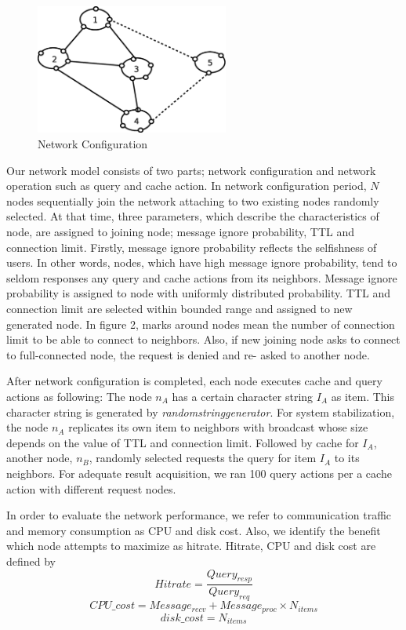 \documentclass[12pt,journal,draftcls,letterpaper,onecolumn]{IEEEtran}
\begin{document}
\begin{figure}
\centering
\includegraphics[width=2.5in]{network}
\caption{Network Configuration} 
\label{fig:network}
\end{figure}

Our network model consists of two parts; network configuration and network operation such
as query and cache action. In network configuration period, $N$ nodes sequentially join the
network attaching to two existing nodes randomly selected. At that time, three parameters,
which describe the characteristics of node, are assigned to joining node; message ignore
probability, TTL and connection limit. Firstly, message ignore probability reflects the
selfishness of users. In other words, nodes, which have high message ignore probability, tend
to seldom responses any query and cache actions from its neighbors. Message ignore
probability is assigned to node with uniformly distributed probability. TTL and connection
limit are selected within bounded range and assigned to new generated node. In figure 2,
marks around nodes mean the number of connection limit to be able to connect to neighbors.
Also, if new joining node asks to connect to full-connected node, the request is denied and re-
asked to another node.

After network configuration is completed, each node executes cache and query actions as
following: The node $n_A$ has a certain character string $I_A$ as item. This character string is
generated by \emph{randomstringgenerator}. For system stabilization, the node $n_A$ replicates its own
item to neighbors with broadcast whose size depends on the value of TTL and connection
limit. Followed by cache for $I_A$, another node, $n_B$, randomly selected requests the query for
item $I_A$ to its neighbors. For adequate result acquisition, we ran 100 query actions per a cache
action with different request nodes.

In order to evaluate the network performance, we refer to communication traffic and
memory consumption as CPU and disk cost. Also, we identify the benefit which node
attempts to maximize as hitrate. Hitrate, CPU and disk cost are defined by
\[
Hitrate=\frac{Query_{resp}}{Query_{req}}
\]
\[
CPU\_cost=Message_{recv}+Message_{proc} \times N_{items}
\]
\[
disk\_cost=N_{items}
\]
\end{document}
